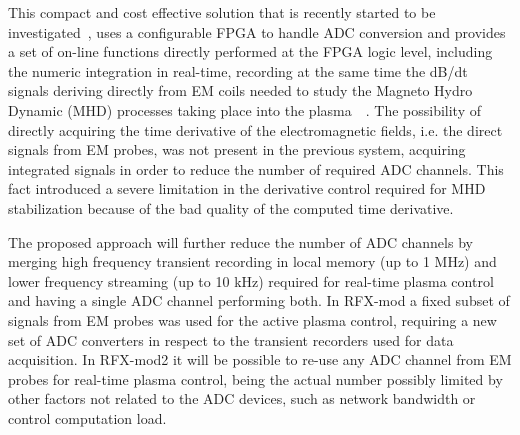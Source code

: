 This compact and cost effective solution that is recently started to be investigated~\cite{gottardo18}, uses a configurable FPGA to handle ADC conversion and provides a set of on-line functions directly performed at the FPGA logic level, including the numeric integration in real-time, recording at the same time the dB/dt signals deriving directly from EM coils needed to study the Magneto Hydro Dynamic (MHD) processes taking place into the plasma~\cite{zuin2009current}~\cite{innocente2014tearing}. The possibility of directly acquiring the time derivative of the electromagnetic fields, i.e. the direct signals from EM probes, was not present in the previous system, acquiring integrated signals in order to reduce the number of required ADC channels. This fact introduced a severe limitation in the derivative control required for MHD stabilization because of the bad quality of the computed time derivative.

The proposed approach will further reduce the number of ADC channels by merging high frequency transient recording in local memory (up to 1 MHz) and lower frequency streaming (up to 10 kHz) required for real-time plasma control and having a single ADC channel performing both. In RFX-mod a fixed subset of signals from EM probes was used for the active plasma control, requiring a new set of ADC converters in respect to the transient recorders used for data acquisition. In RFX-mod2 it will be possible to re-use any ADC channel from EM probes for real-time plasma control, being the actual number possibly limited by other factors not related to the ADC devices, such as network bandwidth or control computation load. 


